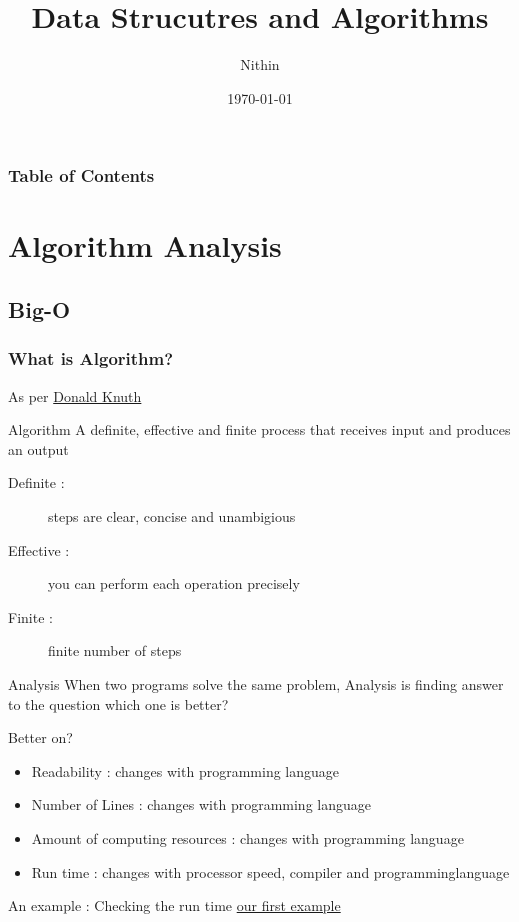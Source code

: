 \documentclass{beamer}
\title{Data Strucutres and Algorithms}
\author{Nithin}
\institute{}
\date{\today}
\begin{document}
\frame{\titlepage}

\begin{frame}
    \frametitle{Table of Contents}
    \tableofcontents
\end{frame}
\section{Algorithm Analysis}
\subsection{Big-O}
\begin{frame}
\frametitle{What is Algorithm?}
As per \href{https://en.wikipedia.org/wiki/Donald_Knuth}{Donald Knuth}
\begin{alertblock}{Algorithm}
     A definite, effective and finite process that receives input and produces an output
\end{alertblock}
\begin{description}
    \item [Definite :] steps are clear, concise and unambigious
    \item [Effective :] you can perform each operation precisely 
    \item [Finite :] finite number of steps
\end{description}
\begin{alertblock}{Analysis}
    When two programs solve the same problem, Analysis is finding answer to the question which one is \alert{better}?
\end{alertblock}

\end{frame}


\begin{frame}{Better on?}
    \begin{itemize}
        \item <1-> Readability : \pause changes with programming language \pause
        \item <2-> Number of Lines : \pause changes with programming language \pause
        \item <3-> Amount of computing resources : \pause changes with programming language\pause
        \item <4-> Run time : \pause changes with processor speed, compiler and programminglanguage
    \end{itemize}
\end{frame}

\begin{frame}{An example : Checking the run time}
    \href{run://home/nithin/Work/python/dsa/big-o/}{our first example}
\end{frame}
\end{document}
